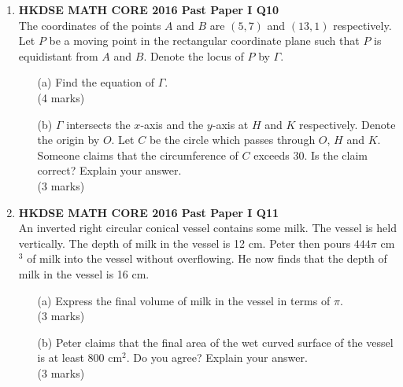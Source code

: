 \documentclass[12pt]{article}
\begin{document}
\begin{enumerate}
	\item \textbf{HKDSE MATH CORE 2016 Past Paper I Q10}\\
	The coordinates of the points $A$ and $B$ are $(5, 7)$ and $(13, 1)$ respectively. Let $P$ be a moving point in the rectangular coordinate plane such that $P$ is equidistant from $A$ and $B$. Denote the locus of $P$ by $\Gamma$.
	\begin{enumerate}
		\item[(a)] Find the equation of $\Gamma$. \\(4 marks)
		\item[(b)] $\Gamma$ intersects the $x$-axis and the $y$-axis at $H$ and $K$ respectively. Denote the origin by $O$. Let $C$ be the circle which passes through $O$, $H$ and $K$. Someone claims that the circumference of $C$ exceeds 30. Is the claim correct? Explain your answer. \\(3 marks)
	\end{enumerate}

	\item \textbf{HKDSE MATH CORE 2016 Past Paper I Q11}\\
	An inverted right circular conical vessel contains some milk. The vessel is held vertically. The depth of milk in the vessel is 12 cm. Peter then pours $444\pi$ cm$^3$ of milk into the vessel without overflowing. He now finds that the depth of milk in the vessel is 16 cm.
	\begin{enumerate}
		\item[(a)] Express the final volume of milk in the vessel in terms of $\pi$. \\(3 marks)
		\item[(b)] Peter claims that the final area of the wet curved surface of the vessel is at least 800 cm$^2$. Do you agree? Explain your answer. \\(3 marks)
	\end{enumerate}


\end{enumerate}
\end{document}
